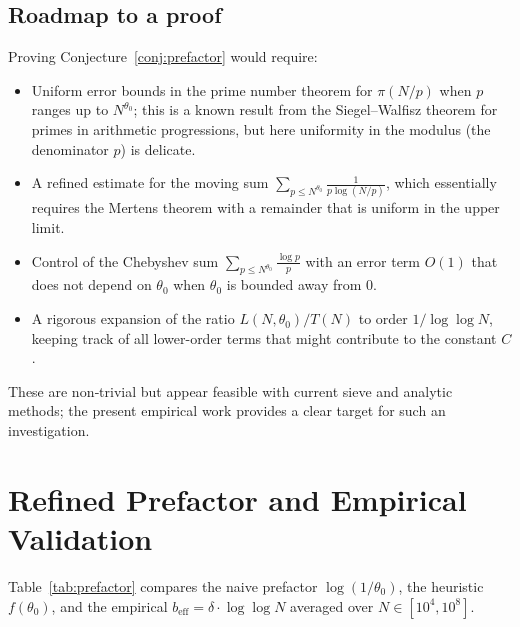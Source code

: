 \documentclass[11pt]{article}
\theoremstyle{definition}
\begin{document}
\subsection*{Roadmap to a proof}
Proving Conjecture~\ref{conj:prefactor} would require:
\begin{itemize}
  \item Uniform error bounds in the prime number theorem for \(\pi(N/p)\) when
        \(p\) ranges up to \(N^{\theta_0}\); this is a known result from the
        Siegel–Walfisz theorem for primes in arithmetic progressions, but here
        uniformity in the modulus (the denominator \(p\)) is delicate.
  \item A refined estimate for the moving sum \(\sum_{p\le N^{\theta_0}} \frac{1}{p\log(N/p)}\),
        which essentially requires the Mertens theorem with a remainder that is
        uniform in the upper limit.
  \item Control of the Chebyshev sum \(\sum_{p\le N^{\theta_0}} \frac{\log p}{p}\) with
        an error term \(O(1)\) that does not depend on \(\theta_0\) when \(\theta_0\) is
        bounded away from 0.
  \item A rigorous expansion of the ratio \(L(N,\theta_0)/T(N)\) to order \(1/\log\log N\),
        keeping track of all lower-order terms that might contribute to the constant
        \(C\).
\end{itemize}
These are non‑trivial but appear feasible with current sieve and analytic methods;
the present empirical work provides a clear target for such an investigation.

\section{Refined Prefactor and Empirical Validation}
\label{sec:prefactor}

Table~\ref{tab:prefactor} compares the naive prefactor \(\log(1/\theta_0)\), the
heuristic \(f(\theta_0)\), and the empirical
\(b_{\mathrm{eff}} = \delta\cdot\log\log N\) averaged over \(N\in[10^4,10^8]\).
\end{document}
